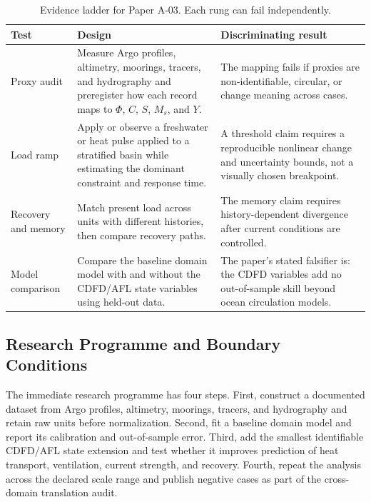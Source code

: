 \documentclass[12pt,a4paper]{article}
\begin{document}
\begin{table}[htbp]
\centering
\small
\caption{Evidence ladder for Paper A-03. Each rung can fail independently.}
\begin{tabularx}{\textwidth}{|p{}|X|X|}
\hline
\textbf{Test} & \textbf{Design} & \textbf{Discriminating result} \\
\hline
Proxy audit & Measure Argo profiles, altimetry, moorings, tracers, and hydrography and preregister how each record maps to $\Phi$, $C$, $S$, $M_s$, and $Y$. & The mapping fails if proxies are non-identifiable, circular, or change meaning across cases. \\
\hline
Load ramp & Apply or observe a freshwater or heat pulse applied to a stratified basin while estimating the dominant constraint and response time. & A threshold claim requires a reproducible nonlinear change and uncertainty bounds, not a visually chosen breakpoint. \\
\hline
Recovery and memory & Match present load across units with different histories, then compare recovery paths. & The memory claim requires history-dependent divergence after current conditions are controlled. \\
\hline
Model comparison & Compare the baseline domain model with and without the CDFD/AFL state variables using held-out data. & The paper's stated falsifier is: the CDFD variables add no out-of-sample skill beyond ocean circulation models. \\
\hline
\end{tabularx}
\end{table}

\subsection{Research Programme and Boundary Conditions}

The immediate research programme has four steps. First, construct a documented
dataset from Argo profiles, altimetry, moorings, tracers, and hydrography and retain raw units before normalization.
Second, fit a baseline domain model and report its calibration and out-of-sample
error. Third, add the smallest identifiable CDFD/AFL state extension and test
whether it improves prediction of heat transport, ventilation, current strength, and recovery. Fourth, repeat the
analysis across the declared scale range and publish negative cases as part of
the cross-domain translation audit.

\end{document}
